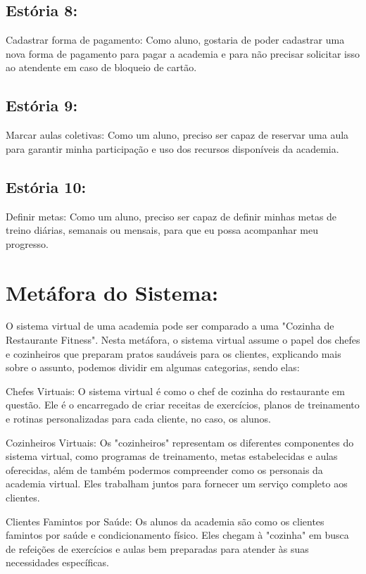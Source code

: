 \documentclass{article}
\begin{document}
\subsection{Estória 8: }
    Cadastrar forma de pagamento: Como aluno, gostaria de poder cadastrar uma nova forma de pagamento para pagar a academia e para não precisar solicitar isso ao atendente em caso de bloqueio de cartão.
\subsection{Estória 9: }
    Marcar aulas coletivas: Como um aluno, preciso ser capaz de reservar uma aula para garantir minha participação e uso dos recursos disponíveis da academia.
\subsection{Estória 10: }
    Definir metas: Como um aluno, preciso ser capaz de definir minhas metas de treino diárias, semanais ou mensais, para que eu possa acompanhar meu progresso.

\section{Metáfora do Sistema: }

O sistema virtual de uma academia pode ser comparado a uma "Cozinha de Restaurante Fitness". Nesta metáfora, o sistema virtual assume o papel dos chefes e cozinheiros que preparam pratos saudáveis para os clientes, explicando mais sobre o assunto, podemos dividir em algumas categorias, sendo elas:

Chefes Virtuais: O sistema virtual é como o chef de cozinha do restaurante em questão. Ele é o encarregado de criar receitas de exercícios, planos de treinamento e rotinas personalizadas para cada cliente, no caso, os alunos.

Cozinheiros Virtuais: Os "cozinheiros" representam os diferentes componentes do sistema virtual, como programas de treinamento, metas estabelecidas e aulas oferecidas, além de também podermos compreender como os personais da academia virtual. Eles trabalham juntos para fornecer um serviço completo aos clientes.

Clientes Famintos por Saúde: Os alunos da academia são como os clientes famintos por saúde e condicionamento físico. Eles chegam à "cozinha" em busca de refeições de exercícios e aulas bem preparadas para atender às suas necessidades específicas.
\end{document}
